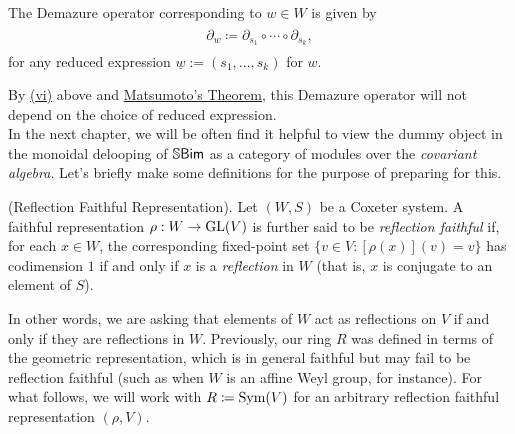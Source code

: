 \noindent\begin{definition} The Demazure operator corresponding to $w \in W$ is given by
\begin{align*}
\begin{split}
\partial_w \coloneqq \partial_{s_1} \circ \cdots \circ \partial_{s_k},
\end{split}
\end{align*}
for any reduced expression $\underline{w} := (s_1, \dots, s_k)$ for $w$.\\
\end{definition}

\noindent By \hyperref[DemazureBraid]{(vi)} above and \hyperref[Matsumoto]{Matsumoto's Theorem}, this Demazure operator will not depend on the choice of reduced expression.\\

\noindent In the next chapter, we will be often find it helpful to view the dummy object in the monoidal delooping of $\mathbb{S}\textnormal{\textsf{Bim}}$ as a category of modules over the {\em covariant algebra}. Let's briefly make some definitions for the purpose of preparing for this.\\

\noindent\begin{definition}\textup{(Reflection Faithful Representation).} Let $(W, S)$ be a Coxeter system. A faithful representation $\rho : W \to \textup{GL}(V)$ is further said to be {\em reflection faithful} if, for each $x \in W$, the corresponding fixed-point set $\{v \in V : [\rho(x)](v) = v\}$ has codimension $1$ if and only if $x$ is a {\em reflection} in $W$ (that is, $x$ is conjugate to an element of $S$).\\
\end{definition}
\newpage

\noindent In other words, we are asking that elements of $W$ act as reflections on $V$ if and only if they are reflections in $W$. Previously, our ring $R$ was defined in terms of the geometric representation, which is in general faithful but may fail to be reflection faithful (such as when $W$ is an affine Weyl group, for instance). For what follows, we will work with $R \coloneqq \textup{Sym}(V)$ for an arbitrary reflection faithful representation $(\rho, V)$.\\

